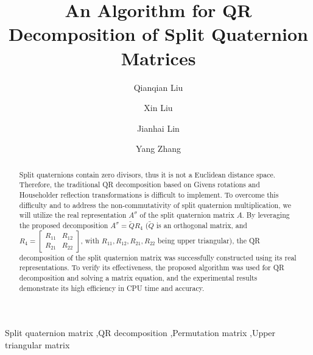\documentclass[3p]{elsarticle}
\numberwithin{equation}{section}
\begin{document}
\begin{frontmatter}

\title{An Algorithm for QR Decomposition of Split Quaternion Matrices}

\author[inst1]{Qianqian Liu}
\author[inst1]{Xin Liu}
\author[inst1]{Jianhai Lin}
\author[inst2]{Yang Zhang}


\address[inst1]{Faculty of Innovation Engineering, Macau University of Science and Technology, Avenida Wai Long, TaiPa, Macau, 999078, P. R. China}
\address[inst2]{Department of Mathematics, University of Manitoba, Winnipeg, MB, R3T 2N2, Canada}

\begin{abstract}
Split quaternions contain zero divisors, thus it is not a Euclidean distance space. Therefore, the traditional QR decomposition based on Givens rotations and Householder reflection transformations is difficult to implement. To overcome this difficulty and to address the non-commutativity of split quaternion multiplication, we will utilize the real representation $A^\sigma$ of the split quaternion matrix $A$.  By leveraging the proposed decomposition $A^\sigma = \widetilde{Q}R_4$  ($\widetilde{Q}$ is an orthogonal matrix, and $R_4 = \begin{bmatrix} R_{11} & R_{12} \\ R_{21} & R_{22} \end{bmatrix}$, with $R_{11}, R_{12}, R_{21}, R_{22}$ being upper triangular), the QR decomposition of the split quaternion matrix was successfully constructed using its real representations. To verify its effectiveness, the proposed algorithm was used for QR decomposition and solving a matrix equation, and the experimental results demonstrate its high efficiency in CPU time and accuracy.
\end{abstract}

\begin{keyword}
Split quaternion matrix \sep QR decomposition \sep Permutation matrix \sep Upper triangular matrix
\end{keyword}

\end{frontmatter}
\end{document}
